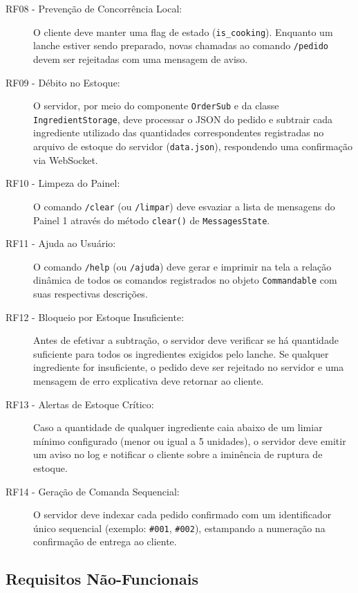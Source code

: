 \documentclass[12pt]{article}
\begin{document}
\begin{description}
    \item[RF08 - Prevenção de Concorrência Local:] O cliente deve manter uma flag de estado (\texttt{is\_cooking}). Enquanto um lanche estiver sendo preparado, novas chamadas ao comando \texttt{/pedido} devem ser rejeitadas com uma mensagem de aviso.

    \item[RF09 - Débito no Estoque:] O servidor, por meio do componente \texttt{OrderSub} e da classe \texttt{IngredientStorage}, deve processar o JSON do pedido e subtrair cada ingrediente utilizado das quantidades correspondentes registradas no arquivo de estoque do servidor (\texttt{data.json}), respondendo uma confirmação via WebSocket.

    \item[RF10 - Limpeza do Painel:] O comando \texttt{/clear} (ou \texttt{/limpar}) deve esvaziar a lista de mensagens do Painel 1 através do método \texttt{clear()} de \texttt{MessagesState}.

    \item[RF11 - Ajuda ao Usuário:] O comando \texttt{/help} (ou \texttt{/ajuda}) deve gerar e imprimir na tela a relação dinâmica de todos os comandos registrados no objeto \texttt{Commandable} com suas respectivas descrições.

    \item[RF12 - Bloqueio por Estoque Insuficiente:] Antes de efetivar a subtração, o servidor deve verificar se há quantidade suficiente para todos os ingredientes exigidos pelo lanche. Se qualquer ingrediente for insuficiente, o pedido deve ser rejeitado no servidor e uma mensagem de erro explicativa deve retornar ao cliente.

    \item[RF13 - Alertas de Estoque Crítico:] Caso a quantidade de qualquer ingrediente caia abaixo de um limiar mínimo configurado (menor ou igual a 5 unidades), o servidor deve emitir um aviso no log e notificar o cliente sobre a iminência de ruptura de estoque.

    \item[RF14 - Geração de Comanda Sequencial:] O servidor deve indexar cada pedido confirmado com um identificador único sequencial (exemplo: \texttt{\#001}, \texttt{\#002}), estampando a numeração na confirmação de entrega ao cliente.
\end{description}

\subsection{Requisitos Não-Funcionais}
\end{document}
